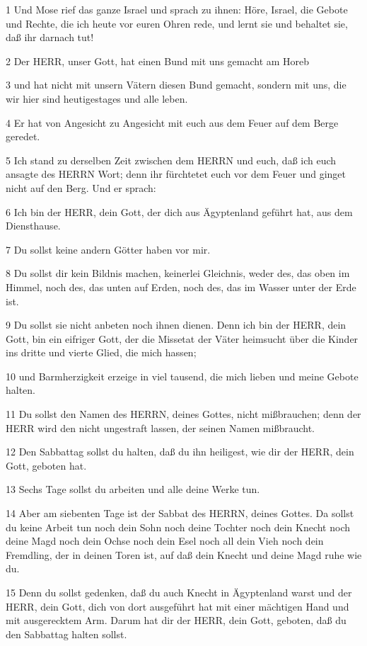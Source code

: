 \par 1 Und Mose rief das ganze Israel und sprach zu ihnen: Höre, Israel, die Gebote und Rechte, die ich heute vor euren Ohren rede, und lernt sie und behaltet sie, daß ihr darnach tut!
\par 2 Der HERR, unser Gott, hat einen Bund mit uns gemacht am Horeb
\par 3 und hat nicht mit unsern Vätern diesen Bund gemacht, sondern mit uns, die wir hier sind heutigestages und alle leben.
\par 4 Er hat von Angesicht zu Angesicht mit euch aus dem Feuer auf dem Berge geredet.
\par 5 Ich stand zu derselben Zeit zwischen dem HERRN und euch, daß ich euch ansagte des HERRN Wort; denn ihr fürchtetet euch vor dem Feuer und ginget nicht auf den Berg. Und er sprach:
\par 6 Ich bin der HERR, dein Gott, der dich aus Ägyptenland geführt hat, aus dem Diensthause.
\par 7 Du sollst keine andern Götter haben vor mir.
\par 8 Du sollst dir kein Bildnis machen, keinerlei Gleichnis, weder des, das oben im Himmel, noch des, das unten auf Erden, noch des, das im Wasser unter der Erde ist.
\par 9 Du sollst sie nicht anbeten noch ihnen dienen. Denn ich bin der HERR, dein Gott, bin ein eifriger Gott, der die Missetat der Väter heimsucht über die Kinder ins dritte und vierte Glied, die mich hassen;
\par 10 und Barmherzigkeit erzeige in viel tausend, die mich lieben und meine Gebote halten.
\par 11 Du sollst den Namen des HERRN, deines Gottes, nicht mißbrauchen; denn der HERR wird den nicht ungestraft lassen, der seinen Namen mißbraucht.
\par 12 Den Sabbattag sollst du halten, daß du ihn heiligest, wie dir der HERR, dein Gott, geboten hat.
\par 13 Sechs Tage sollst du arbeiten und alle deine Werke tun.
\par 14 Aber am siebenten Tage ist der Sabbat des HERRN, deines Gottes. Da sollst du keine Arbeit tun noch dein Sohn noch deine Tochter noch dein Knecht noch deine Magd noch dein Ochse noch dein Esel noch all dein Vieh noch dein Fremdling, der in deinen Toren ist, auf daß dein Knecht und deine Magd ruhe wie du.
\par 15 Denn du sollst gedenken, daß du auch Knecht in Ägyptenland warst und der HERR, dein Gott, dich von dort ausgeführt hat mit einer mächtigen Hand und mit ausgerecktem Arm. Darum hat dir der HERR, dein Gott, geboten, daß du den Sabbattag halten sollst.
